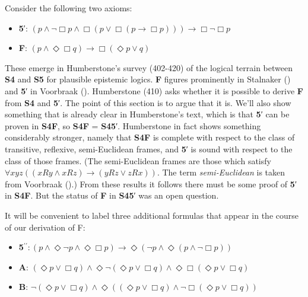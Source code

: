 \documentclass[
  11pt,
  letterpaper,
  DIV=11,
  numbers=noendperiod,
  twoside]{scrartcl}
\providecommand{\tightlist}{%
  \setlength{\itemsep}{0pt}\setlength{\parskip}{0pt}}
\begin{document}
Consider the following two axioms:

\begin{itemize}
\tightlist
\item
  \textbf{5}′:
  \((p \wedge \neg \Box p \wedge \Box (p \vee \Box (p \rightarrow \Box p))) \rightarrow \Box \neg \Box p\)
\item
  \textbf{F}:
  \((p\wedge \Diamond\Box q) \rightarrow \Box (\Diamond p\vee q)\)
\end{itemize}

These emerge in Humberstone's survey (402-420) of the logical terrain
between \textbf{S4} and \textbf{S5} for plausible epistemic logics.
\textbf{F} figures prominently in Stalnaker
() and \textbf{5}′ in Voorbraak
(). Humberstone (410) asks whether it
is possible to derive \textbf{F} from \textbf{S4} and \textbf{5}′. The
point of this section is to argue that it is. We'll also show something
that is already clear in Humberstone's text, which is that \textbf{5}′
can be proven in \textbf{S4F}, so \textbf{S4F} = \textbf{S45}′.
Humberstone in fact shows something considerably stronger, namely that
\textbf{S4F} is complete with respect to the class of transitive,
reflexive, semi-Euclidean frames, and \textbf{5}′ is sound with respect
to the class of those frames. (The semi-Euclidean frames are those which
satisfy \(\forall xyz((xRy \wedge xRz) \rightarrow (yRz \vee zRx))\).
The term \emph{semi-Euclidean} is taken from Voorbraak
().) From these results it follows
there must be some proof of \textbf{5}′ in \textbf{S4F}. But the status
of \textbf{F} in \textbf{S45}′ was an open question.

It will be convenient to label three additional formulas that appear in
the course of our derivation of F:

\begin{itemize}
\tightlist
\item
  \textbf{5}\(^{\prime\prime}\!: (p \wedge \Diamond\neg p \wedge \Diamond\Box p) \rightarrow \Diamond(\neg p \wedge \Diamond(p\wedge \neg \Box p))\)
\item
  \textbf{A}:
  \((\Diamond{p}\vee \Box q) \wedge \Diamond\neg (\Diamond{p}\vee \Box q) \wedge \Diamond\Box (\Diamond{p}\vee \Box q)\)
\item
  \textbf{B}:
  \(\neg (\Diamond{p}\vee \Box q) \wedge \Diamond((\Diamond{p}\vee \Box q) \wedge \neg \Box (\Diamond{p}\vee \Box q))\)
\end{itemize}
\end{document}
